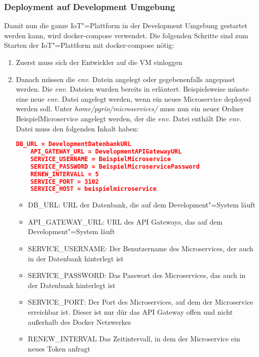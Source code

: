 \subsubsection{Deployment auf Development Umgebung}
\label{sec:iot:dockerdepl}
Damit nun die ganze IoT"=Plattform in der Development Umgebung gestartet werden kann, wird docker-compose verwendet. Die folgenden Schritte sind zum Starten der IoT"=Plattform mit docker-compose nötig: 
\begin{enumerate}
	\item Zuerst muss sich der Entwickler auf die VM einloggen
	\item Danach müssen die \textit{env.} Datein angelegt oder gegebenenfalls angepasst werden. Die \textit{env.} Dateien wurden bereits in  erläutert. \newline
	Beispielsweise müsste eine neue \textit{env.} Datei angelegt werden, wenn ein neues Microservice deployed werden soll. Unter \textit{home/pgrio/microservices/} muss nun ein neuer Ordner BeispielMicroservice angelegt werden, der die \textit{env.} Datei enthält \newline
	Die \textit{env.} Datei muss den folgenden Inhalt haben: \newline
	\begin{lstlisting}[language=json,firstnumber=1,basicstyle=\footnotesize]
	DB_URL = DevelopmentDatenbankURL
	API_GATEWAY_URL = DevelopmentAPIGatewayURL
	SERVICE_USERNAME = BeispielMicroservice
	SERVICE_PASSWORD = BeispielMicroservicePassword
	RENEW_INTERVALL = 5
	SERVICE_PORT = 3102
	SERVICE_HOST = beispielmicroservice
	\end{lstlisting}
	\begin{itemize}
		\item DB\_URL: URL der Datenbank, die auf dem Development"=System läuft
		\item API\_GATEWAY\_URL: URL des API Gateways, das auf dem Development"=System läuft
		\item SERVICE\_USERNAME: Der Benutzername des Microservices, der auch in der Datenbank hinterlegt ist
		\item SERVICE\_PASSWORD: Das Passwort des Microservices, das auch in der Datenbank hinterlegt ist
		\item SERVICE\_PORT: Der Port des Microservices, auf dem der Microservice erreichbar ist. Dieser ist nur dür das API Gateway offen und nicht außerhalb des Docker Netzwerkes
		\item RENEW\_INTERVAL Das Zeitintervall, in dem der Microservice ein neues Token anfragt

\end{itemize}
\end{enumerate}
